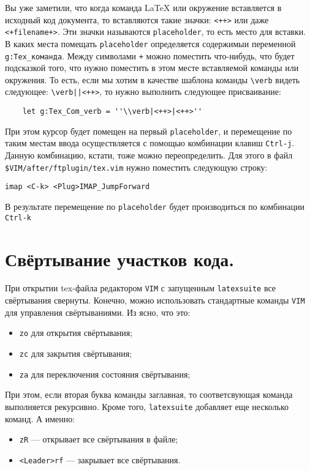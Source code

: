 \documentclass[a4paper]{article}
\begin{document}
Вы уже заметили, что когда команда \LaTeX{} или окружение вставляется в исходный код документа, 
то вставляются такие значки: \verb|<++>| или даже \verb|<+filename+>|. Эти значки называются 
\texttt{placeholder}, то есть место для вставки. В каких места помещать \texttt{placeholder}
определяется содержимыи переменной \verb|g:Tex_команда|. Между символами \texttt{+} можно поместить
что-нибудь, что будет подсказкой того, что нужно поместить в этом месте вставляемой команды
или окружения. То есть, если мы хотим в качестве шаблона команды \verb|\verb| 
видеть следующее: \verb$\verb||<++>$, то нужно выполнить следующее присваивание:
\begin{verbatim}
	let g:Tex_Com_verb = ''\\verb|<++>|<++>''
\end{verbatim}
При этом курсор будет помещен на первый \texttt{placeholder}, и перемещение по таким 
местам ввода осуществляется с помощью комбинации клавиш \texttt{Ctrl-j}. Данную комбинацию,
кстати, тоже можно переопределить. Для этого в файл \verb|$VIM/after/ftplugin/tex.vim| 
нужно поместить следующую строку:
\begin{verbatim}
imap <C-k> <Plug>IMAP_JumpForward
\end{verbatim}
В результате перемещение по \texttt{placeholder} будет производиться по комбинации \texttt{Ctrl-k}
\part{Свёртывание участков кода.}
			При открытии tex-файла редактором \texttt{VIM} с запущенным \texttt{latexsuite}
			все свёртывания свернуты. Конечно, можно использовать стандартные команды \texttt{VIM}
			для управления свёртываниями. Из \cite{bib-book-vim} ясно, что это:
			\begin{itemize}
			  \item \texttt{zo} для открытия свёртывания;
			  \item \texttt{zc} для закрытия свёртывания;
			  \item \texttt{za} для переключения состояния свёртывания;
			\end{itemize}
			При этом, если вторая буква команды заглавная, то соответсвующая команда выполняется 
			рекурсивно. 
			Кроме того, \texttt{latexsuite} добавляет еще несколько команд. А именно:
			\begin{itemize}
			  \item \texttt{zR} --- открывает все свёртывания в файле;
			  \item \texttt{<Leader>rf} --- закрывает все свёртывания.
			\end{itemize}
\end{document}
